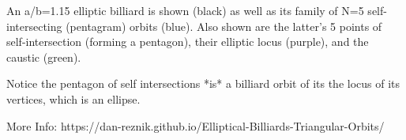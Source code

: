 An a/b=1.15 elliptic billiard is shown (black) as well as its family of N=5 self-intersecting (pentagram) orbits (blue). Also shown are the latter's 5 points of self-intersection (forming a pentagon), their elliptic locus (purple), and the caustic (green).

Notice the pentagon of self intersections *is* a billiard orbit of its the locus of its vertices, which is an ellipse.

More Info:  https://dan-reznik.github.io/Elliptical-Billiards-Triangular-Orbits/